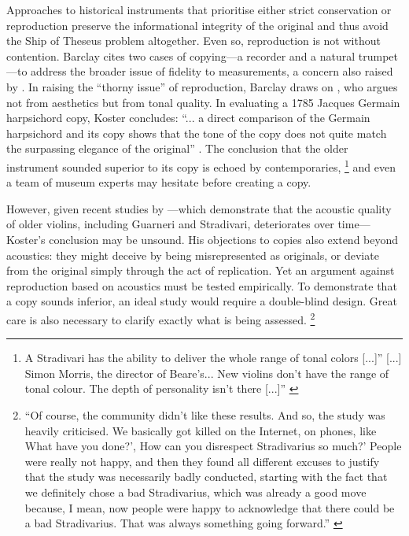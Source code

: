 Approaches to historical instruments that prioritise either strict conservation
or reproduction preserve the informational integrity of the original and thus
avoid the Ship of Theseus problem altogether. Even so, reproduction is not
without contention. Barclay cites two cases of copying---a recorder and a
natural trumpet---to address the broader issue of fidelity to measurements, a
concern also raised by \textcite{koster_exact_1994}. In raising the ``thorny
issue'' \cite{barclay_preservation_2005} of reproduction, Barclay draws on
\textcite{koster_restoration_1996}, who argues not from aesthetics but from
tonal quality. In evaluating a 1785 Jacques Germain harpsichord copy, Koster
concludes: ``... a direct comparison of the Germain harpsichord and its copy
shows that the tone of the copy does not quite match the surpassing elegance of
the original'' \cite{koster_restoration_1996}. The conclusion that the older
instrument sounded superior to its copy is echoed by contemporaries,%
\footnote{A Stradivari has the ability to deliver the whole range of tonal colors [...]''
[...] Simon Morris, the director of Beare’s... New violins don’t have the range
of tonal colour. The depth of personality isn’t there [...]''
\cite{mead_musical_2014}} 
and even a team of museum experts may hesitate before creating a copy.

However, given recent studies by \textcite{fritz_player_2012,
fritz_soloist_2014, fritz_listener_2017}---which demonstrate that the acoustic
quality of older violins, including Guarneri and Stradivari, deteriorates over
time---Koster’s conclusion may be unsound. His objections to copies also extend
beyond acoustics: they might deceive by being misrepresented as originals, or
deviate from the original simply through the act of replication. Yet an argument
against reproduction based on acoustics must be tested empirically. To
demonstrate that a copy sounds inferior, an ideal study would require a
double-blind design. Great care is also necessary to clarify exactly what is
being assessed.%
\footnote{``Of course, the community didn't like these results.
And so, the study was heavily criticised. We basically got killed on the
Internet, on phones, like What have you done?', How can you disrespect
Stradivarius so much?' People were really not happy, and then they found all
different excuses to justify that the study was necessarily badly conducted,
starting with the fact that we definitely chose a bad Stradivarius, which was
already a good move because, I mean, now people were happy to acknowledge that
there could be a bad Stradivarius. That was always something going forward.''
\cite{fritz_musica_2017}}

